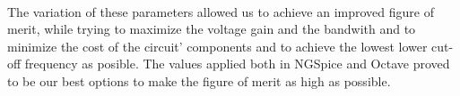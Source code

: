 \paragraph{}
The variation of these parameters allowed us to achieve an improved figure of merit, while trying to maximize the voltage gain and the bandwith and to minimize the cost of the circuit' components and to achieve the lowest lower cut-off frequency as posible. The values applied both in NGSpice and Octave proved to be our best options to make the figure of merit as high as possible.
